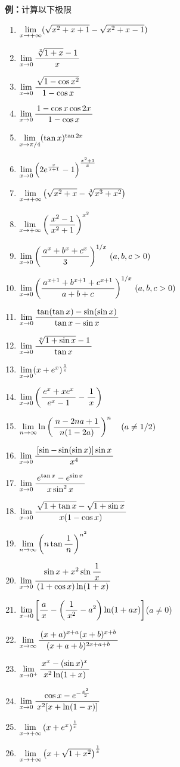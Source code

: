 {\bf 例：}计算以下极限
\begin{enumerate}[(1)]
  \setlength{\itemindent}{1cm}
  \item $\limx{+\infty}(\sqrt{x^2+x+1}-\sqrt{x^2+x-1})$ 
  \item $\limx{0}\df{\sqrt[3]{1+x}-1}{x}$ 
  \item $\limx{0}\df{\sqrt{1-\cos x^2}}{1-\cos x}$ 
  \item $\limx{0}\df{1-\cos x\cos 2x}{1-\cos x}$
  \item $\limx{\pi /4}(\tan x)^{\tan 2x}$ 
  \item $\limx{0}\left(2e^{\frac{x}{x+1}}-1\right)^{\frac{x^2+1}{x}}$ 
  \item $\limx{+\infty}\left(\sqrt{x^2+x}-\sqrt[3]{x^3+x^2}\right)$ 
  \item $\limx{+\infty}\left(\df{x^2-1}{x^2+1}\right)^{x^2}$
  \item $\limx{0}\left(\df{a^x+b^x+c^x}{3}\right)^{1/x}\,(a,b,c>0)$ 
  \item $\limx{0}\left(\df{a^{x+1}+b^{x+1}+c^{x+1}}{a+b+c}\right)^{1/x}
  \,(a,b,c>0)$ 
  \item $\limx{0}\df{\tan(\tan x)-\sin(\sin x)}{\tan x-\sin x}$
  \item $\limx0\df{\sqrt[n]{1+\sin x}-1}{\tan x}$
  \item $\limx0(x+e^x)^{\frac1x}$
  \item $\limx0\left(\df{e^x+xe^x}{e^x-1}-\df1x\right)$
  \item $\limn\ln\left(\df{n-2na+1}{n(1-2a)}\right)^n\quad(a\ne1/2)$
  \item $\limx0\df{[\sin-\sin(\sin x)]\sin x}{x^4}$
  \item $\limx0\df{e^{\tan x}-e^{\sin x}}{x\sin^2x}$
  \item $\limx0\df{\sqrt{1+\tan x}-\sqrt{1+\sin x}}{x(1-\cos x)}$
  \item $\limn\left(n\tan\df1n\right)^{n^2}$
  \item $\limx0\df{\sin x+x^2\sin\df1x}{(1+\cos x)\ln(1+x)}$
  \item $\limx0\left[\df
  ax-\left(\df1{x^2}-a^2\right)\ln(1+ax)\right]$\quad($a\ne 0$)
  \item $\limx{\infty}\df{(x+a)^{x+a}(x+b)^{x+b}}{(x+a+b)^{2x+a+b}}$
  \item $\limx{0^+}\df{x^x-(\sin x)^x}{x^2\ln(1+x)}$
  \item $\limx0\df{\cos x-e^{-\frac{x^2}2}}{x^2[x+\ln(1-x)]}$
  \item $\limx{+\infty}\left(x+e^x\right)^{\frac1x}$
  \item $\limx{+\infty}\left(x+\sqrt{1+x^2}\right)^{\frac1x}$

\end{enumerate}
